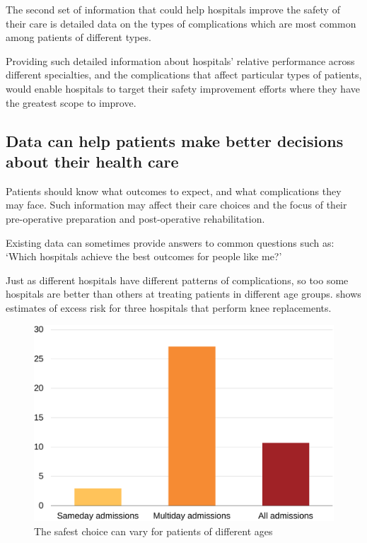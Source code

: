 \documentclass[FrontPage]{grattan}
\begin{document}
The second set of information that could help hospitals improve the safety of their care is detailed data on the types of complications which are most common among patients of different types.

Providing such detailed information about hospitals' relative performance across different specialties, and the complications that affect particular types of patients, would enable hospitals to target their safety improvement efforts where they have the greatest scope to improve.

\subsection{Data can help patients make better decisions about their health care}\label{subsec:data-can-help-patients-make-better-decisions-about-their-health-care}

Patients should know what outcomes to expect, and what complications they may face.
Such information may affect their care choices and the focus of their pre-operative preparation and post-operative rehabilitation.

Existing data can sometimes provide answers to common questions such as: `Which hospitals achieve the best outcomes for people like me?'

Just as different hospitals have different patterns of complications, so too some hospitals are better than others at treating patients in different age groups.
 shows estimates of excess risk for three hospitals that perform knee replacements.

\begin{figure}
\caption{The safest choice can vary for patients of different ages}\label{fig:3-7-safe-choice-varies-by-age}
\includegraphics[page=19]{atlas/comps_charts.pdf}
\end{figure}
\end{document}
